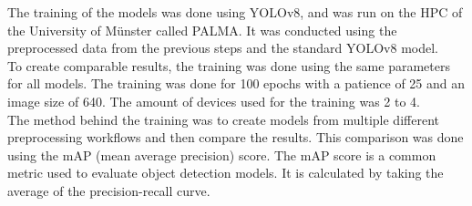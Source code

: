 The training of the models was done using YOLOv8, and was run on the HPC of the University of Münster called PALMA. It was conducted using the preprocessed data from the previous steps and the standard YOLOv8 model. \\
To create comparable results, the training was done using the same parameters for all models. The training was done for 100 epochs with a patience of 25 and an image size of 640. The amount of devices used for the training was 2 to 4. \\ 
The method behind the training was to create models from multiple different preprocessing workflows and then compare the results. This comparison was done using the mAP (mean average precision) score. The mAP score is a common metric used to evaluate object detection models. It is calculated by taking the average of the precision-recall curve.\\
